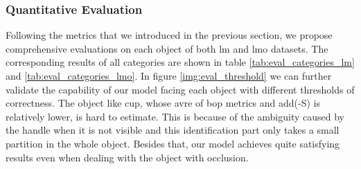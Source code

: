 \documentclass[12pt,DIV14,BCOR12mm,a4paper,footinclude=false,headinclude,parskip=half-,twoside,openright,cleardoublepage=empty,toc=index,bibliography=totoc,listof=totoc]{scrreprt}
\numberwithin{equation}{chapter}
\begin{document}
\subsubsection{Quantitative Evaluation}
Following the metrics that we introduced in the previous section, we propose comprehensive evaluations on each object of both \gls{lm} and \gls{lmo} datasets. The corresponding results of all categories are shown in table \ref{tab:eval_categories_lm} and \ref{tab:eval_categories_lmo}. In figure \ref{img:eval_threshold} we can further validate the capability of our model facing each object with different thresholds of correctness. The object like cup, whose \gls{avre} of \gls{bop} metrics and \gls{add}(-S) is relatively lower, is hard to estimate. This is because of the ambiguity caused by the handle when it is not visible and this identification part only takes a small partition in the whole object. Besides that, our model achieves quite satisfying results even when dealing with the object with occlusion.
\end{document}
